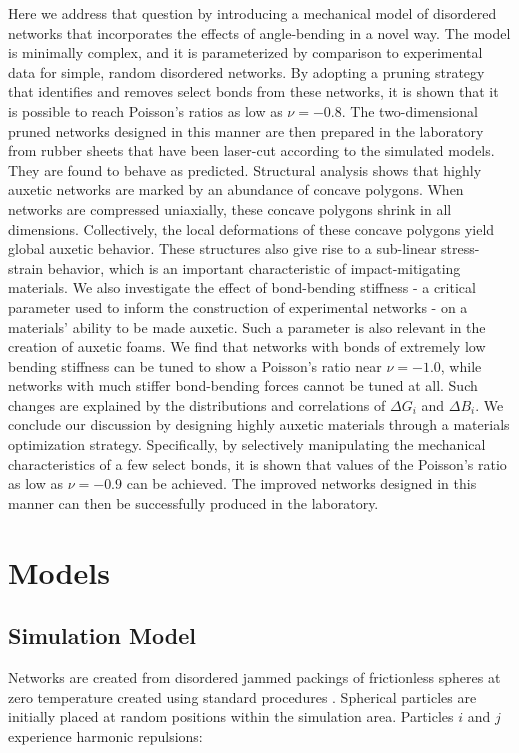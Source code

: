 \documentclass[9pt,twocolumn,twoside]{pnas-new}
\begin{document}
Here we address that question by introducing a mechanical model of disordered networks that incorporates the effects of angle-bending in a novel way.  The model is minimally complex, and it is parameterized by comparison to experimental data for simple, random disordered networks. By adopting a pruning strategy that identifies and removes select bonds from these networks, it is shown that it is possible to reach Poisson's ratios as low as $\nu=-0.8$. The two-dimensional pruned networks designed in this manner are then prepared in the laboratory from rubber sheets that have been laser-cut according to the simulated models. They are found to behave as predicted. Structural analysis shows that highly auxetic networks are marked by an abundance of concave polygons.  When networks are compressed uniaxially, these concave polygons shrink in all dimensions.  Collectively, the local deformations of these concave polygons yield global auxetic behavior.  These structures also give rise to a sub-linear stress-strain behavior, which is an important characteristic of impact-mitigating materials. We also investigate the effect of bond-bending stiffness - a critical parameter used to inform the construction of experimental networks - on a materials' ability to be made auxetic.  Such a parameter is also relevant in the creation of auxetic foams.  We find that networks with bonds of extremely low bending stiffness can be tuned to show a Poisson's ratio near $\nu=-1.0$, while networks with much stiffer bond-bending forces cannot be tuned at all.  Such changes are explained by the distributions and correlations of $\Delta G_{i}$ and $\Delta B_{i}$. We conclude our discussion by designing highly auxetic materials through a materials optimization strategy. Specifically, by selectively manipulating the mechanical characteristics of a few select bonds, it is shown that values of the Poisson's ratio as low as $\nu=-0.9$ can be achieved. The improved networks designed in this manner can then be successfully produced in the laboratory.

\section*{Models}

\subsection*{Simulation Model}

Networks are created from disordered jammed packings of frictionless spheres at zero temperature created using standard procedures \cite{liu2010jamming}.  Spherical particles are initially placed at random positions within the simulation area.  Particles $i$ and $j$ experience harmonic repulsions:
\end{document}
